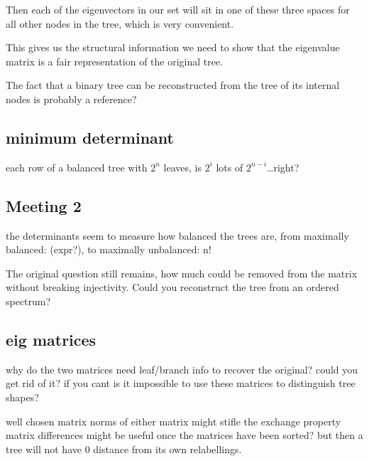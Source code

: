 \documentclass{report}
\begin{document}
Then each of the eigenvectors in our set will sit in one of these three spaces
for all other nodes in the tree, which is very convenient.

This gives us the structural information we need to show that the eigenvalue
matrix is a fair representation of the original tree.

The fact that a binary tree can be reconstructed from the tree of its internal
nodes is probably a reference?

\subsection{minimum determinant}

each row of a balanced tree with $2^n$ leaves, is $2^i$ lots of $2^{n-i}$\ldots right?

\subsection{Meeting 2}

the determinants seem to measure how balanced the trees are, from maximally
balanced: (expr?), to maximally unbalanced: n!

The original question still remains, how much could be removed from the matrix
without breaking injectivity. Could you reconstruct the tree from an ordered
spectrum?

\subsection{eig matrices}

why do the two matrices need leaf/branch info to recover the original? could
you get rid of it? if you cant is it impossible to use these matrices to
distinguish tree shapes?

well chosen matrix norms of either matrix might stifle the exchange property
matrix differences might be useful once the matrices have been sorted? but then
a tree will not have 0 distance from its own relabellings.
\end{document}
